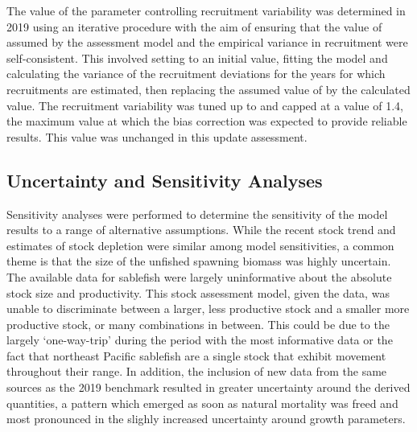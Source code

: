 \documentclass[11pt,
  english,
  a4paper,
]{article}
\begin{document}
\leavevmode\tagmcend\tagstructend\par


The value of the parameter controlling recruitment variability was determined in 2019 using an iterative procedure with the aim of ensuring that the value of assumed by the assessment model and the empirical variance in recruitment were self-consistent. This involved setting to an initial value, fitting the model and calculating the variance of the recruitment deviations for the years for which recruitments are estimated, then replacing the assumed value of by the calculated value. The recruitment variability was tuned up to and capped at a value of 1.4, the maximum value at which the bias correction was expected to provide reliable results. This value was unchanged in this update assessment.

\leavevmode\tagmcend\tagstructend\par


\hypertarget{uncertainty-and-sensitivity-analyses}{%
\subsection{Uncertainty and Sensitivity Analyses}\label{uncertainty-and-sensitivity-analyses}}

\leavevmode\tagmcend\tagstructend


Sensitivity analyses were performed to determine the sensitivity of the model results to a range of alternative assumptions. While the recent stock trend and estimates of stock depletion were similar among model sensitivities, a common theme is that the size of the unfished spawning biomass was highly uncertain. The available data for sablefish were largely uninformative about the absolute stock size and productivity. This stock assessment model, given the data, was unable to discriminate between a larger, less productive stock and a smaller more productive stock, or many combinations in between. This could be due to the largely `one-way-trip' during the period with the most informative data or the fact that northeast Pacific sablefish are a single stock that exhibit movement throughout their range. In addition, the inclusion of new data from the same sources as the 2019 benchmark resulted in greater uncertainty around the derived quantities, a pattern which emerged as soon as natural mortality was freed and most pronounced in the slighly increased uncertainty around growth parameters.
\end{document}
